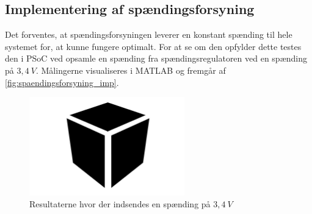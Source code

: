 \subsection{Implementering af spændingsforsyning}
Det forventes, at spændingsforsyningen leverer en konstant spænding til hele systemet for, at kunne fungere optimalt. For at se om den opfylder dette testes den i PSoC ved opsamle en spænding fra spændingsregulatoren ved en spænding på $3,4~V$. Målingerne visualiseres i MATLAB og fremgår af \autoref{fig:spaendingsforsyning_imp}.

\begin{figure}[H]
\centering
\includegraphics[width=0.6\textwidth]{figures/blackbox}
\caption{Resultaterne hvor der indsendes en spænding på $3,4~V$}
\label{fig:spaendingsforsyning_imp}
\end{figure}
